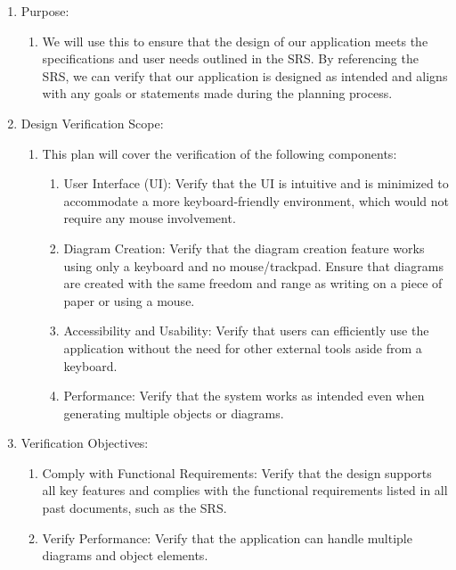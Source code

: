 \documentclass[12pt, titlepage]{article}
\begin{document}
\begin{enumerate}
\item Purpose:
\begin{enumerate}
\item We will use this to ensure that the design of our application
meets the specifications and user needs outlined in the SRS.
By referencing the SRS, we can verify that our application
is designed as intended and aligns with any goals or statements
made during the planning process.
\end{enumerate}

\item Design Verification Scope:
\begin{enumerate}
\item This plan will cover the verification of the following components:
\begin{enumerate}
\item User Interface (UI): Verify that the UI is intuitive
and is minimized to accommodate a more keyboard-friendly
environment, which would not require any mouse involvement.
\item Diagram Creation: Verify that the diagram creation
feature works using only a keyboard and no mouse/trackpad.
Ensure that diagrams are created with the same freedom
and range as writing on a piece of paper or using a mouse.
\item Accessibility and Usability: Verify that users
can efficiently use the application without the need
for other external tools aside from a keyboard.
\item Performance: Verify that the system works as
intended even when generating multiple objects or diagrams.
\end{enumerate}
\end{enumerate}

\item Verification Objectives:
\begin{enumerate}
\item Comply with Functional Requirements: Verify that
the design supports all key features and complies with
the functional requirements listed in all past
documents, such as the SRS.
\item Verify Performance: Verify that the
application can handle multiple diagrams
and object elements.
\end{enumerate}


\end{enumerate}
\end{document}
